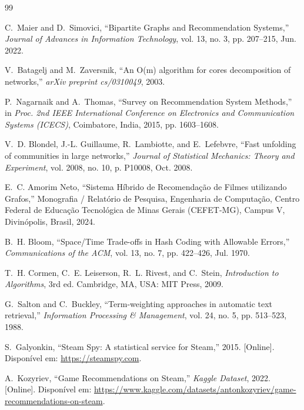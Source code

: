 \documentclass[conference]{IEEEtran}
\begin{document}
\begin{thebibliography}{99}

C.~Maier and D.~Simovici, ``Bipartite Graphs and Recommendation Systems,'' \textit{Journal of Advances in Information Technology}, vol. 13, no. 3, pp. 207--215, Jun. 2022.

V.~Batagelj and M.~Zaversnik, ``An O(m) algorithm for cores decomposition of networks,'' \textit{arXiv preprint cs/0310049}, 2003.

P.~Nagarnaik and A.~Thomas, ``Survey on Recommendation System Methods,'' in \textit{Proc. 2nd IEEE International Conference on Electronics and Communication Systems (ICECS)}, Coimbatore, India, 2015, pp. 1603--1608.

V.~D. Blondel, J.-L. Guillaume, R.~Lambiotte, and E.~Lefebvre, ``Fast unfolding of communities in large networks,'' \textit{Journal of Statistical Mechanics: Theory and Experiment}, vol. 2008, no. 10, p. P10008, Oct. 2008.

E.~C. Amorim Neto, ``Sistema Híbrido de Recomendação de Filmes utilizando Grafos,'' Monografia / Relatório de Pesquisa, Engenharia de Computação, Centro Federal de Educação Tecnológica de Minas Gerais (CEFET-MG), Campus V, Divinópolis, Brasil, 2024.

B.~H. Bloom, ``Space/Time Trade-offs in Hash Coding with Allowable Errors,'' \textit{Communications of the ACM}, vol. 13, no. 7, pp. 422--426, Jul. 1970.

T.~H. Cormen, C.~E. Leiserson, R.~L. Rivest, and C.~Stein, \textit{Introduction to Algorithms}, 3rd ed. Cambridge, MA, USA: MIT Press, 2009.

G.~Salton and C.~Buckley, ``Term-weighting approaches in automatic text retrieval,'' \textit{Information Processing \& Management}, vol. 24, no. 5, pp. 513--523, 1988.

S.~Galyonkin, ``Steam Spy: A statistical service for Steam,'' 2015. [Online]. Disponível em: \url{https://steamspy.com}.

A.~Kozyriev, ``Game Recommendations on Steam,'' \textit{Kaggle Dataset}, 2022. [Online]. Disponível em: \url{https://www.kaggle.com/datasets/antonkozyriev/game-recommendations-on-steam}.


\end{thebibliography}
\end{document}
